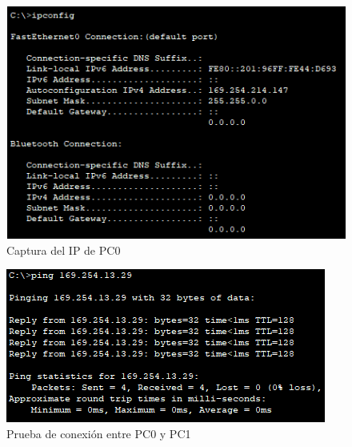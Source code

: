 \documentclass{article}
\begin{document}
        \begin{figure}[h!]
            \centering
            \includegraphics[scale=0.8]{img/ipconfig-test.png}
            \caption{Captura del IP de PC0}
            \label{fig:ipconfig-test}
        \end{figure}

        \clearpage
        \begin{figure}[h!]
            \centering
            \includegraphics[scale=0.8]{img/ping-test.png}
            \caption{Prueba de conexión entre PC0 y PC1}
            \label{fig:ping-test}
        \end{figure}
\end{document}
